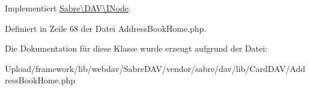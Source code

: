Implementiert \mbox{\hyperlink{interface_sabre_1_1_d_a_v_1_1_i_node_ac90fa5526e98def2e1f51bc57a772366}{Sabre\textbackslash{}\+D\+A\+V\textbackslash{}\+I\+Node}}.



Definiert in Zeile 68 der Datei Address\+Book\+Home.\+php.



Die Dokumentation für diese Klasse wurde erzeugt aufgrund der Datei\+:\begin{DoxyCompactItemize}
\item 
Upload/framework/lib/webdav/\+Sabre\+D\+A\+V/vendor/sabre/dav/lib/\+Card\+D\+A\+V/Address\+Book\+Home.\+php\end{DoxyCompactItemize}
